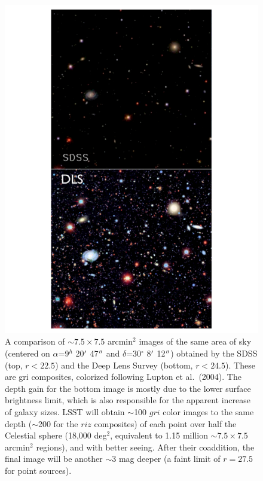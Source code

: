 \begin{figure}
\hskip -0.8in
\includegraphics[width=1.5\hsize,clip]{panels1_2.pdf}
\caption{A comparison of $\sim7.5\times7.5$ arcmin$^2$ images of
the same area of sky (centered on $\alpha$=9$^h$ 20$\mbox{$^\prime$}$ 47$\mbox{$^{\prime\prime}$}$ and
$\delta$=30$^\circ$ 8$\mbox{$^\prime$}$ 12$\mbox{$^{\prime\prime}$}$) obtained by the SDSS (top, $r<22.5$) and
the Deep Lens Survey (bottom, $r<24.5$). These are gri composites,
colorized following Lupton et al.~(2004).  The depth gain for the bottom image
is mostly due to the lower surface brightness limit, which is also responsible
for the apparent increase of galaxy sizes. LSST will obtain $\sim$100 $gri$
color images to the same depth ($\sim$200 for the $riz$ composites) of each point
over half the Celestial sphere (18,000 deg$^2$, equivalent to 1.15 million $\sim7.5\times7.5$
arcmin$^2$ regions), and with better seeing. After their coaddition, the final
image will be another $\sim3$ mag deeper (a faint limit of $r=27.5$ for point
sources).}
\label{Fig:panels1}
\end{figure}

